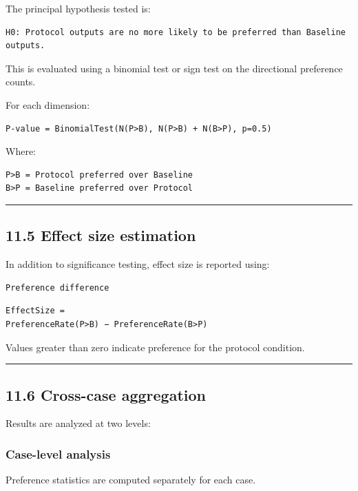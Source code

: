 {The principal hypothesis tested is:

\begin{verbatim}
H0: Protocol outputs are no more likely to be preferred than Baseline outputs.
\end{verbatim}

This is evaluated using a binomial test or sign test on the directional preference counts.

For each dimension:

\begin{verbatim}
P-value = BinomialTest(N(P>B), N(P>B) + N(B>P), p=0.5)
\end{verbatim}

Where:

\begin{verbatim}
P>B = Protocol preferred over Baseline
B>P = Baseline preferred over Protocol
\end{verbatim}

\noindent\rule{\textwidth}{0.4pt}

\subsection*{11.5 Effect size estimation}

In addition to significance testing, effect size is reported using:

\begin{verbatim}
Preference difference
\end{verbatim}

\begin{verbatim}
EffectSize =
PreferenceRate(P>B) − PreferenceRate(B>P)
\end{verbatim}

Values greater than zero indicate preference for the protocol condition.

\noindent\rule{\textwidth}{0.4pt}

\subsection*{11.6 Cross-case aggregation}

Results are analyzed at two levels:

\subsubsection*{Case-level analysis}

Preference statistics are computed separately for each case.

}
